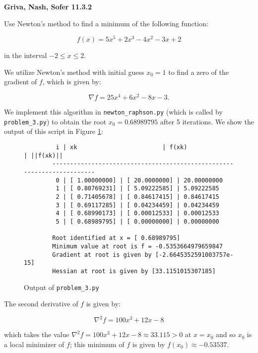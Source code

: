 \textbf{Griva, Nash, Sofer 11.3.2}

Use Newton's method to find a minimum of the following function:

$$
f(x) = 5x^5 + 2x^3 - 4x^2 - 3x + 2
$$

in the interval $-2 \le x \le 2$.

\begin{solution}
    We utilize Newton's method with initial guess $x_0 = 1$ to find a zero of the gradient of $f$, which is given by:

    $$
    \nabla f = 25 x^4 + 6x^2 - 8x - 3.
    $$

    We implement this algorithm in \texttt{newton\_raphson.py} (which is called by 
    \texttt{problem\_3.py}) to obtain the root $x_0 = 0.68989795$ after 5 iterations. We show the output of this script 
    in Figure \ref{fig:problem_3}:
    \ \\

    \begin{figure}[h]
        \centering
        \begin{verbatim}
         i | xk                        | f(xk)                     | ||f(xk)||            
        -----------------------------------------------------------------------
         0 | [ 1.00000000] | [ 20.0000000] | 20.00000000
         1 | [ 0.80769231] | [ 5.09222585] | 5.09222585
         2 | [ 0.71405678] | [ 0.84617415] | 0.84617415
         3 | [ 0.69117285] | [ 0.04234459] | 0.04234459
         4 | [ 0.68990173] | [ 0.00012533] | 0.00012533
         5 | [ 0.68989795] | [ 0.00000000] | 0.00000000

        Root identified at x = [ 0.68989795]
        Minimum value at root is f = -0.5353664979659847
        Gradient at root is given by [-2.6645352591003757e-15]
        Hessian at root is given by [33.1151015307185]
        \end{verbatim}
        \caption{Output of \texttt{problem\_3.py}}
        \label{fig:problem_3}
    \end{figure}

    The second derivative of $f$ is given by:

    $$
    \nabla^2 f = 100 x^3 + 12x - 8
    $$

    which takes the value $\nabla^2 f = 100 x^3 + 12x - 8 \approx 33.115 > 0$ at $x = x_0$ and so $x_0$ is a local 
    minimizer of $f$; this minimum of $f$ is given by $f(x_0) \approx -0.53537$.
    \ \\
\end{solution}
